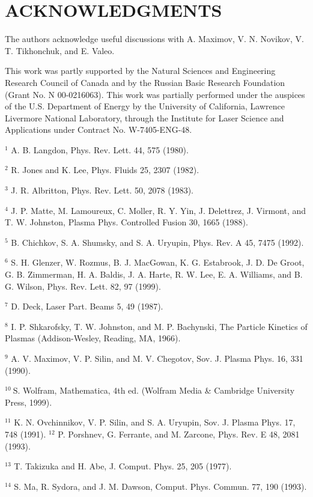 \documentclass[oneside,onecolumn]{article}
\begin{document}
\begin{sloppypar}
\section{ACKNOWLEDGMENTS}
The authors acknowledge useful discussions with A. Maximov, V. N. Novikov, V. T. Tikhonchuk, and E. Valeo.

This work was partly supported by the Natural Sciences and Engineering Research Council of Canada and by the Russian Basic Research Foundation (Grant No. N 00-0216063). This work was partially performed under the auspices of the U.S. Department of Energy by the University of California, Lawrence Livermore National Laboratory, through the Institute for Laser Science and Applications under Contract No. W-7405-ENG-48.

${ }^{1}$ A. B. Langdon, Phys. Rev. Lett. 44, 575 (1980).

${ }^{2}$ R. Jones and K. Lee, Phys. Fluids 25, 2307 (1982).

${ }^{3}$ J. R. Albritton, Phys. Rev. Lett. 50, 2078 (1983).

${ }^{4}$ J. P. Matte, M. Lamoureux, C. Moller, R. Y. Yin, J. Delettrez, J. Virmont, and T. W. Johnston, Plasma Phys. Controlled Fusion 30, 1665 (1988).

${ }^{5}$ B. Chichkov, S. A. Shumsky, and S. A. Uryupin, Phys. Rev. A 45, 7475 (1992).

${ }^{6}$ S. H. Glenzer, W. Rozmus, B. J. MacGowan, K. G. Estabrook, J. D. De Groot, G. B. Zimmerman, H. A. Baldis, J. A. Harte, R. W. Lee, E. A. Williams, and B. G. Wilson, Phys. Rev. Lett. 82, 97 (1999).

${ }^{7}$ D. Deck, Laser Part. Beams 5, 49 (1987).

${ }^{8}$ I. P. Shkarofsky, T. W. Johnston, and M. P. Bachynski, The Particle Kinetics of Plasmas (Addison-Wesley, Reading, MA, 1966).

${ }^{9}$ A. V. Maximov, V. P. Silin, and M. V. Chegotov, Sov. J. Plasma Phys. 16, 331 (1990).

${ }^{10} \mathrm{~S}$. Wolfram, Mathematica, 4th ed. (Wolfram Media \& Cambridge University Press, 1999).

${ }^{11}$ K. N. Ovchinnikov, V. P. Silin, and S. A. Uryupin, Sov. J. Plasma Phys. 17, 748 (1991). ${ }^{12}$ P. Porshnev, G. Ferrante, and M. Zarcone, Phys. Rev. E 48, 2081 (1993).

${ }^{13}$ T. Takizuka and H. Abe, J. Comput. Phys. 25, 205 (1977).

${ }^{14}$ S. Ma, R. Sydora, and J. M. Dawson, Comput. Phys. Commun. 77, 190 (1993).


\end{sloppypar}
\end{document}
